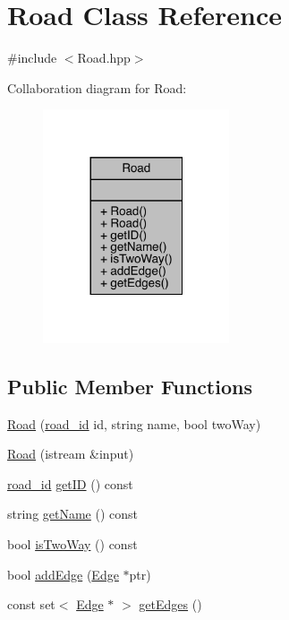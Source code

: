 \hypertarget{class_road}{}\section{Road Class Reference}
\label{class_road}


{\ttfamily \#include $<$Road.\+hpp$>$}



Collaboration diagram for Road\+:\nopagebreak
\begin{figure}[H]
\begin{center}
\leavevmode
\includegraphics[width=156pt]{class_road__coll__graph}
\end{center}
\end{figure}
\subsection*{Public Member Functions}
\begin{DoxyCompactItemize}
\item 
\hyperlink{class_road_a4bd6abfd59885bb839dff8642b32db92}{Road} (\hyperlink{_road_8hpp_a8e0db0d135782948da5d293720dbfb46}{road\+\_\+id} id, string name, bool two\+Way)
\item 
\hyperlink{class_road_a96d7a3bee9ce4ea3ed6ed8eb24298085}{Road} (istream \&input)
\item 
\hyperlink{_road_8hpp_a8e0db0d135782948da5d293720dbfb46}{road\+\_\+id} \hyperlink{class_road_a4e0440c1d5bf11800f0df3c50dcb4b92}{get\+ID} () const
\item 
string \hyperlink{class_road_ae7c959eda8a11bc859ab5de5e278b735}{get\+Name} () const
\item 
bool \hyperlink{class_road_a9c412810b3a630a759f199c60f7f1cc6}{is\+Two\+Way} () const
\item 
bool \hyperlink{class_road_a7a691f98e8bd53299ed2539de1e4d13c}{add\+Edge} (\hyperlink{class_edge}{Edge} $\ast$ptr)
\item 
const set$<$ \hyperlink{class_edge}{Edge} $\ast$ $>$ \hyperlink{class_road_a03fb1c0a74b860e4be6c951154add098}{get\+Edges} ()
\end{DoxyCompactItemize}


